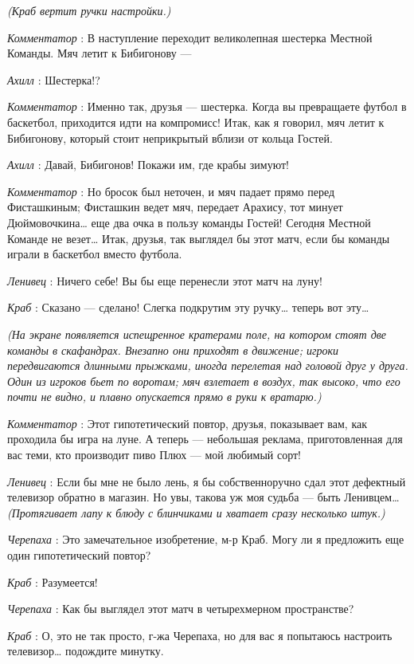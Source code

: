 \documentclass[../main.tex]{subfiles}
\begin{document}
\begin{dialogue}
\emph{(Краб вертит ручки настройки.)}

\emph{Комментатор} : В наступление переходит великолепная шестерка Местной Команды. Мяч летит к Бибигонову ---

\emph{Ахилл} : Шестерка!?

\emph{Комментатор} : Именно так, друзья --- шестерка. Когда вы превращаете футбол в баскетбол, приходится идти на компромисс! Итак, как я говорил, мяч летит к Бибигонову, который стоит неприкрытый вблизи от кольца Гостей.

\emph{Ахилл} : Давай, Бибигонов! Покажи им, где крабы зимуют!

\emph{Комментатор} : Но бросок был неточен, и мяч падает прямо перед Фисташкиным; Фисташкин ведет мяч, передает Арахису, тот минует Дюймовочкина\ldots{} еще два очка в пользу команды Гостей! Сегодня Местной Команде не везет\ldots{} Итак, друзья, так выглядел бы этот матч, если бы команды играли в баскетбол вместо футбола.

\emph{Ленивец} : Ничего себе! Вы бы еще перенесли этот матч на луну!

\emph{Краб} : Сказано --- сделано! Слегка подкрутим эту ручку\ldots{} теперь вот эту\ldots{}

\emph{(На экране появляется испещренное кратерами поле, на котором стоят две команды в скафандрах. Внезапно они приходят в движение; игроки передвигаются длинными прыжками, иногда перелетая над головой друг у друга. Один из игроков бьет по воротам; мяч взлетает в воздух, так высоко, что его почти не видно, и плавно опускается прямо в руки к вратарю.)}

\emph{Комментатор} : Этот гипотетический повтор, друзья, показывает вам, как проходила бы игра на луне. А теперь --- небольшая реклама, приготовленная для вас теми, кто производит пиво Плюх --- мой любимый сорт!

\emph{Ленивец} : Если бы мне не было лень, я бы собственноручно сдал этот дефектный телевизор обратно в магазин. Но увы, такова уж моя судьба --- быть Ленивцем\ldots{} \emph{(Протягивает лапу к блюду с блинчиками и хватает сразу несколько штук.)}

\emph{Черепаха} : Это замечательное изобретение, м-р Краб. Могу ли я предложить еще один гипотетический повтор?

\emph{Краб} : Разумеется!

\emph{Черепаха} : Как бы выглядел этот матч в четырехмерном пространстве?

\emph{Краб} : О, это не так просто, г-жа Черепаха, но для вас я попытаюсь настроить телевизор\ldots{} подождите минутку.


\end{dialogue}
\end{document}
